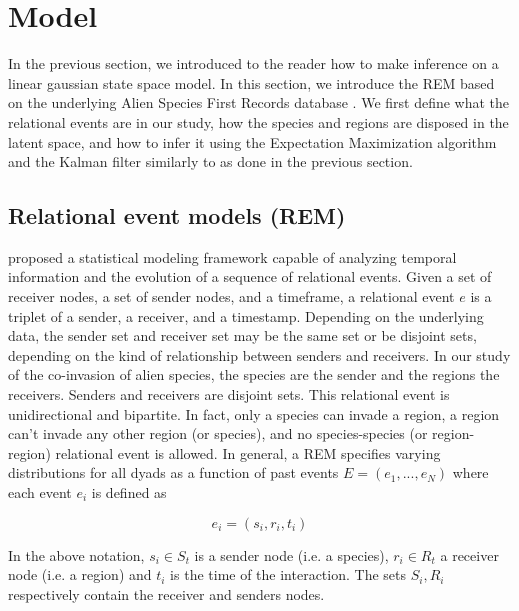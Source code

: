 \documentclass[mscthesis]{usiinfthesis}
\begin{document}
\chapter{Model}
In the previous section, we introduced to the reader how to make inference on a linear gaussian state space model. In this section, we introduce the REM based on the underlying Alien Species First Records database \cite{intro:dataset}. We first define what the relational events are in our study, how the species and regions are disposed in the latent space, and how to infer it using the Expectation Maximization algorithm and the Kalman filter similarly to as done in the previous section.

\section{Relational event models (REM)}
\label{model:rem}

\citet{rem:butts} proposed a statistical modeling framework capable of analyzing temporal information and the evolution of a sequence of relational events. Given a set of receiver nodes, a set of sender nodes, and a timeframe, a relational event $e$ is a triplet of a sender, a receiver, and a timestamp. Depending on the underlying data, the sender set and receiver set may be the same set or be disjoint sets, depending on the kind of relationship between senders and receivers. In our study of the co-invasion of alien species, the species are the sender and the regions the receivers. Senders and receivers are disjoint sets. This relational event is unidirectional and bipartite. In fact, only a species can invade a region, a region can't invade any other region (or species), and no species-species (or region-region) relational event is allowed. In general, a REM specifies varying distributions for all dyads as a function of past events $E=(e_1, ..., e_N)$ where each event $e_i$ is defined as


\[
e_i = (s_i, r_i, t_i)
\]

In the above notation, $s_i \in S_{t} $ is a sender node (i.e. a species), $r_i \in R_{t}$ a receiver node (i.e. a region) and $t_i$ is the time of the interaction. The sets $S_i, R_i$ respectively contain the receiver and senders nodes.

%
\end{document}
